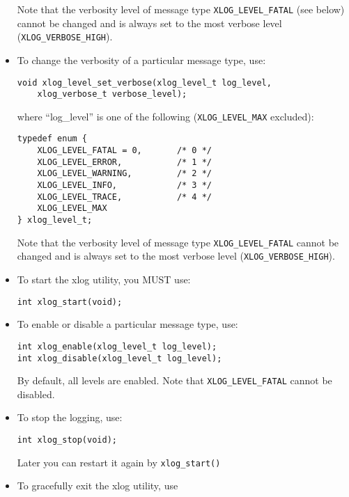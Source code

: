 \documentclass[11pt]{article}
\begin{document}
\begin{itemize}
   Note that the verbosity level of message type \verb=XLOG_LEVEL_FATAL= (see
   below) cannot be changed and is always set to the most verbose level
   (\verb=XLOG_VERBOSE_HIGH=).

  \item To change the verbosity of a particular message type, use:

\begin{verbatim}
void xlog_level_set_verbose(xlog_level_t log_level,
	xlog_verbose_t verbose_level);
\end{verbatim}

where ``log\_level'' is one of the following (\verb=XLOG_LEVEL_MAX=
excluded):

\begin{verbatim}
typedef enum {
    XLOG_LEVEL_FATAL = 0,       /* 0 */
    XLOG_LEVEL_ERROR,           /* 1 */
    XLOG_LEVEL_WARNING,         /* 2 */
    XLOG_LEVEL_INFO,            /* 3 */
    XLOG_LEVEL_TRACE,           /* 4 */
    XLOG_LEVEL_MAX
} xlog_level_t;
\end{verbatim}

   Note that the verbosity level of message type \verb=XLOG_LEVEL_FATAL=
   cannot be changed and is always set to the most verbose level
   (\verb=XLOG_VERBOSE_HIGH=).

  \item To start the xlog utility, you MUST use:

\begin{verbatim}
int xlog_start(void);
\end{verbatim}
	

  \item To enable or disable a particular message type, use:

\begin{verbatim}
int xlog_enable(xlog_level_t log_level);
int xlog_disable(xlog_level_t log_level);
\end{verbatim}
	
	By default, all levels are enabled.
	Note that \verb=XLOG_LEVEL_FATAL= cannot be disabled.

  \item To stop the logging, use:

\begin{verbatim}
int xlog_stop(void);
\end{verbatim}

	Later you can restart it again by \verb=xlog_start()=

  \item To gracefully exit the xlog utility, use


\end{itemize}
\end{document}
